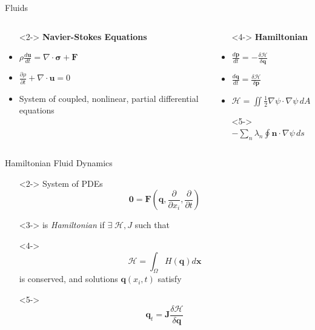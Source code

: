 \documentclass{beamer}
\begin{document}
		\begin{frame}[t]{Fluids}
			\begin{columns}
				\begin{column}{0.5\textwidth}
					\begin{itemize}
						\item[]<2-> \textbf{Navier-Stokes Equations}
						\item<3-> $\rho\frac{d \mathbf{u}}{dt} = \nabla\cdot\mathbf{\sigma} + \mathbf{F}$
						\item<3-> $\frac{\partial \rho}{\partial t} + \nabla\cdot\mathbf{u} = 0$
						\item<3-> System of coupled, nonlinear, partial differential equations
					\end{itemize}
				\end{column}
				\begin{column}{0.5\textwidth}
					\begin{itemize}
						\item[]<4-> \textbf{Hamiltonian}
						\item<5-> $\frac{d \mathbf{p}}{dt} = -\frac{\delta \mathcal{H}}{\delta \mathbf{q}}$
						\item<5-> $\frac{d \mathbf{q}}{dt} = \frac{\delta \mathcal{H}}{\delta \mathbf{p}}$
						\item<5-> $\mathcal{H} = \iint \frac12 \nabla\psi\cdot\nabla\psi \, dA$
						\item[]<5->$- \sum_n \lambda_n \oint \mathbf{n}\cdot\nabla\psi \, ds$
					\end{itemize}
				\end{column}
			\end{columns}
		\end{frame}
		\begin{frame}[t]{Hamiltonian Fluid Dynamics}
			\begin{itemize}
				\item[]<2-> System of PDEs $$\mathbf{0} = \textbf{F}\left(\mathbf{q}, \frac{\partial}{\partial x_i}, \frac{\partial}{\partial t} \right)$$
				\item[]<3-> is \emph{Hamiltonian} if $\exists \; \mathcal{H}, J$ such that
				\item[]<4->$$\mathcal{H} = \int_\Omega H(\mathbf{q}) d\mathbf{x}$$ is conserved, and solutions $\mathbf{q}(x_i, t)$ satisfy
				\item[]<5-> $$\mathbf{q}_t = \mathbf{J}\frac{\delta \mathcal{H}}{\delta \mathbf{q}}$$
			\end{itemize}
		\end{frame}
\end{document}
